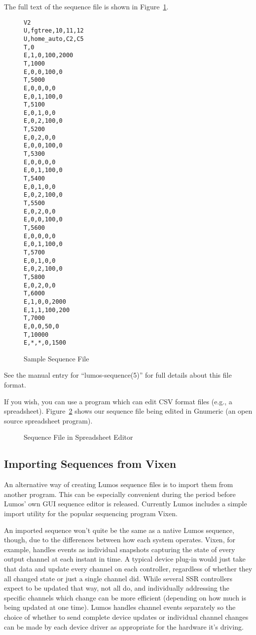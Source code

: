 \documentclass{article}
\begin{document}
The full text of the sequence file is shown in Figure~\ref{seq:all}.

\begin{figure}[p]
\begin{verbatim}
V2
U,fgtree,10,11,12
U,home_auto,C2,C5
T,0
E,1,0,100,2000
T,1000
E,0,0,100,0
T,5000
E,0,0,0,0
E,0,1,100,0
T,5100
E,0,1,0,0
E,0,2,100,0
T,5200
E,0,2,0,0
E,0,0,100,0
T,5300
E,0,0,0,0
E,0,1,100,0
T,5400
E,0,1,0,0
E,0,2,100,0
T,5500
E,0,2,0,0
E,0,0,100,0
T,5600
E,0,0,0,0
E,0,1,100,0
T,5700
E,0,1,0,0
E,0,2,100,0
T,5800
E,0,2,0,0
T,6000
E,1,0,0,2000
E,1,1,100,200
T,7000
E,0,0,50,0
T,10000
E,*,*,0,1500
\end{verbatim}
\caption{Sample Sequence File}
\label{seq:all}
\end{figure}

See the manual entry for ``lumos-sequence(5)'' for full details about this
file format.

If you wish, you can use a program which can edit CSV format files (e.g., a
spreadsheet).  Figure~\ref{seq:ss} shows our sequence file being edited in
Gnumeric (an open source spreadsheet program).

\begin{figure}[p]
\caption{Sequence File in Spreadsheet Editor}
\label{seq:ss}
\end{figure}

\subsection{Importing Sequences from Vixen}
An alternative way of creating Lumos sequence files is to import them from
another program.  This can be especially convenient during the period before
Lumos' own GUI sequence editor is released.  Currently Lumos includes a simple 
import utility for the popular sequencing program Vixen.  

An imported sequence won't quite be the same as a native Lumos sequence,
though, due to the differences between how each system operates.  
Vixen, for example, handles events as individual snapshots capturing the state of every output channel at each instant in time. A typical device plug-in would just take that data and update every channel on each controller, regardless of whether they all changed state or just a single channel did. While several SSR controllers expect to be updated that way, not all do, and individually addressing the specific channels which change can be more efficient (depending on how much is being updated at one time). Lumos handles channel events separately so the choice of whether to send complete device updates or individual channel changes can be made by each device driver as appropriate for the hardware it's driving.
\end{document}
